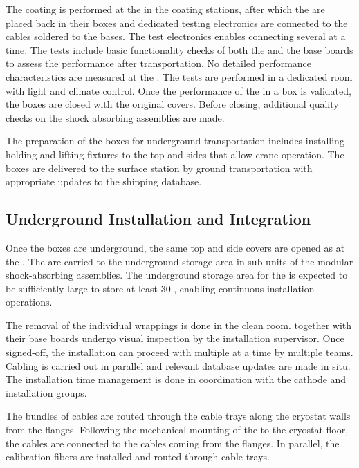 The  coating is performed at the  in the coating stations, after which  the  are placed back in their boxes and dedicated testing electronics are connected to the  cables soldered to the  bases. The test electronics enables connecting several  at a time. The tests include basic functionality checks of both the  and the base boards to assess the performance after transportation. No detailed performance characteristics are measured at the . The tests are performed in a dedicated room with light and climate control. Once the performance of the  in a box is validated, the boxes are closed with the original covers. Before closing, additional quality checks on the shock absorbing assemblies are made.

The preparation of the  boxes for underground transportation includes installing holding and lifting fixtures to the top and sides %
that allow crane operation. The boxes are delivered to the surface station by ground transportation with %
appropriate updates to the shipping database.

\subsection{Underground Installation and Integration}
\label{sec:fddp-pd-9.3}

Once the  boxes are underground, the same top and side covers are opened as at the . The  are carried to the underground storage area in sub-units of the modular shock-absorbing assemblies. The underground storage area for the  is expected to be sufficiently large to store at least \num{30} , enabling continuous installation operations.

The removal of the individual  wrappings is done in the clean room.  together with their base boards undergo visual inspection by the  installation supervisor. Once signed-off, the installation can proceed with multiple  at a time by multiple teams. Cabling is carried out in parallel and relevant database updates are made in situ. The installation time management is done in coordination with the cathode and  installation groups.

The bundles of cables are routed through the cable trays along the cryostat walls from the  flanges. Following the mechanical mounting of the  to the cryostat floor, the  cables are 
connected to the cables coming from the flanges. In parallel, the calibration fibers are installed and routed through cable trays.

